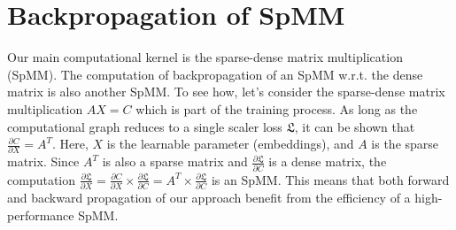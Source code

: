 \section{Backpropagation of SpMM}
\label{A:backprop}
 Our main computational kernel is the sparse-dense matrix multiplication (SpMM). The computation of backpropagation of an SpMM w.r.t. the dense matrix is also another SpMM. To see how, let's consider the sparse-dense matrix multiplication $AX = C$ which is part of the training process. As long as the computational graph reduces to a single scaler loss $\mathfrak{L}$, it can be shown that $\frac{\partial C}{\partial X} = A^T$. Here, $X$ is the learnable parameter (embeddings), and $A$ is the sparse matrix. Since $A^T$ is also a sparse matrix and $\frac{\partial \mathfrak{L}}{\partial C}$ is a dense matrix, the computation $\frac{\partial \mathfrak{L}}{\partial X} = \frac{\partial C}{\partial X} \times \frac{\partial \mathfrak{L}}{\partial C} = A^T \times \frac{\partial \mathfrak{L}}{\partial C} $ is an SpMM. This means that both forward and backward propagation of our approach benefit from the efficiency of a high-performance SpMM.

